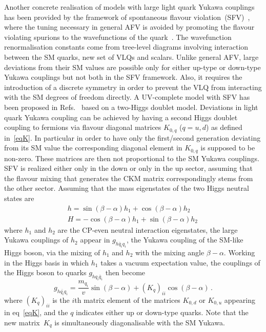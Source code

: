 Another concrete realisation of models with large light quark Yukawa couplings has been provided by the framework of spontaneous flavour violation~(SFV)~\cite{Egana-Ugrinovic:2018znw}, where the tuning necessary in general AFV is avoided by promoting the flavour violating spurions to the wavefunctions of the quark~\cite{Egana-Ugrinovic:2018znw}. The wavefunction renormalisation constants come from tree-level diagrams involving interaction between the SM quarks, new set of VLQs and scalars. Unlike general AFV, large deviations from their SM values are possible only for either up-type or down-type Yukawa couplings but not both in the SFV framework. Also, it requires the introduction of a discrete symmetry in order to prevent the VLQ from interacting with the SM degrees of freedom directly. A UV-complete model with SFV has been proposed in Refs.~\cite{Egana-Ugrinovic:2019dqu,Egana-Ugrinovic:2021uew} based on a two-Higgs doublet model.  Deviations in light quark Yukawa coupling can be achieved by having a second Higgs doublet coupling to fermions via flavour diagonal matrices $K_{0,q}$ ($q=u,d$) as defined in~\eqref{eqK}. In particular in order to have only the first/second generation deviating from its SM value the corresponding diagonal element in $K_{0,q}$ is supposed to be non-zero. These matrices are then not proportional to the SM Yukawa couplings. SFV  is realized either only in the down or only in the up sector, assuming that the flavour mixing that generates the CKM matrix correspondingly stems from the other sector.
Assuming that the mass eigenstates of the two Higgs neutral states are
\begin{align}
	h=\sin (\beta-\alpha) h_1+ \cos(\beta-\alpha) h_2\,\\
	H=-\cos(\beta-\alpha) h_1 +\sin(\beta-\alpha) h_2\,
\end{align}
where $h_1$ and $h_2$ are the CP-even neutral interaction eigenstates, the large Yukawa couplings of $h_2$ appear in $g_{h\bar{q}_iq_i}$, the Yukawa coupling of the SM-like Higgs boson, via the mixing of $h_1$ and $h_2$ with the mixing angle $\beta-\alpha$.  Working in the Higgs basis in which $h_1$ takes a vacuum expectation value, the couplings of the Higgs boson to quarks $g_{hq_i\bar{q}_i}$ then become
\begin{equation}
	g_{h\bar{q_i}q_i}= \frac{m_{q_i}}{v} \sin(\beta-\alpha) + (K_{q})_{ii}\cos{(\beta-\alpha)}\,.  \label{eq:ghqq2HDM}  
\end{equation}
where $(K_{q})_{ii}$ is the $i$th matrix element of the matrices $K_{0,d}$ or $K_{0,u}$ appearing in eq~\eqref{eqK}, and the $q$ indicates either up or down-type quarks. Note that the new matrix~$K_{q}$ is simultaneously diagonalisable with the SM Yukawa.
